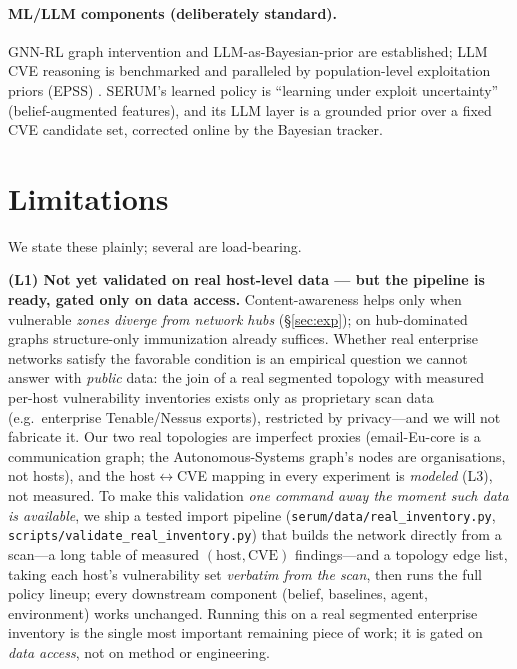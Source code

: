 \documentclass[11pt]{article}
\begin{document}
\paragraph{ML/LLM components (deliberately standard).} GNN-RL graph intervention
\citep{meirom2021rlgn2,fan2020finder} and LLM-as-Bayesian-prior
\citep{yan2025llmpriors} are established; LLM CVE reasoning is benchmarked
\citep{ctibench2024} and paralleled by population-level exploitation priors
(EPSS) \citep{epss2021}. SERUM's learned policy is ``learning under exploit
uncertainty'' (belief-augmented features), and its LLM layer is a grounded prior
over a fixed CVE candidate set, corrected online by the Bayesian tracker.

\section{Limitations}
We state these plainly; several are load-bearing.

\textbf{(L1) Not yet validated on real host-level data --- but the pipeline is
ready, gated only on data access.} Content-awareness helps only when vulnerable
\emph{zones diverge from network hubs} (\S\ref{sec:exp}); on hub-dominated graphs
structure-only immunization already suffices. Whether real enterprise networks
satisfy the favorable condition is an empirical question we cannot answer with
\emph{public} data: the join of a real segmented topology with measured per-host
vulnerability inventories exists only as proprietary scan data (e.g.\ enterprise
Tenable/Nessus exports), restricted by privacy---and we will not fabricate it. Our
two real topologies are imperfect proxies (email-Eu-core is a communication graph;
the Autonomous-Systems graph's nodes are organisations, not hosts), and the
host$\leftrightarrow$CVE mapping in every experiment is \emph{modeled} (L3), not
measured. To make this validation \emph{one command away the moment such data is
available}, we ship a tested import pipeline
(\texttt{serum/data/real\_inventory.py}, \texttt{scripts/validate\_real\_inventory.py})
that builds the network directly from a scan---a long table of measured
$(\text{host},\text{CVE})$ findings---and a topology edge list, taking each host's
vulnerability set \emph{verbatim from the scan}, then runs the full policy lineup;
every downstream component (belief, baselines, agent, environment) works unchanged.
Running this on a real segmented enterprise inventory is the single most important
remaining piece of work; it is gated on \emph{data access}, not on method or
engineering.
\end{document}
